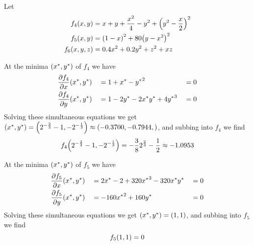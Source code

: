 \documentclass[11pt]{article} %
\let\originalleft\left
\let\originalright\right
\renewcommand{\left}{\mathopen{}\mathclose\bgroup\originalleft}
\renewcommand{\right}{\aftergroup\egroup\originalright}
\begin{document}
Let 
\begin{align*}
	f_4\left(x, y\right) = {} & x + y + \frac{x^2}{4} - y^2 + \left(y^2 - \frac{x}{2}\right)^2 \\
	f_5\left(x, y\right) = {} & \left(1-x\right)^2 + 80\left(y-x^2\right)^2 \\
	f_6\left(x, y,z\right) = {} & 0.4x^2 + 0.2y^2 +z^2 + xz
\end{align*}

At the minima $\left(x^*, y^* \right)$ of $f_4$ we have
\begin{alignat*}{3}
	&\frac{\partial f_4}{\partial x}\left(x^*,y^*\right) &&=  1+x^*-{y^*}^2  && = 0 \\
	&\frac{\partial f_4}{\partial y}\left(x^*,y^*\right) &&=  1-2{y^*}-2{x^*}{y^*}+4{y^*}^3  && = 0
\end{alignat*}
Solving these simultaneous equations we get $\left(x^*, y^* \right) = \left(2^{-\frac{2}{3}} -1, -2^{-\frac{1}{3}} \right) \approx \left(-0.3700, -0.7944,\right)$, and subbing into $f_4$ we find 
$$f_4\left(2^{-\frac{2}{3}} -1, -2^{-\frac{1}{3}} \right) = -\frac{3}{8}2^{\frac{2}{3}}-\frac{1}{2} \approx -1.0953$$

At the minima $\left(x^*, y^* \right)$ of $f_5$ we have
\begin{alignat*}{3}
	& \frac{\partial f_5}{\partial x}\left(x^*,y^*\right) &&=  2{x^*} - 2 + 320{x^*}^3 -320{x^*}{y^*} && =  0 \\
	&\frac{\partial f_5}{\partial y}\left(x^*,y^*\right) &&= -160{x^*}^2 + 160{y^*} && = 0
\end{alignat*}
Solving these simultaneous equations we get $\left(x^*, y^* \right) = \left(1, 1 \right)$, and subbing into $f_5$ we find 
$$f_5\left(1, 1 \right) = 0$$
\end{document}
